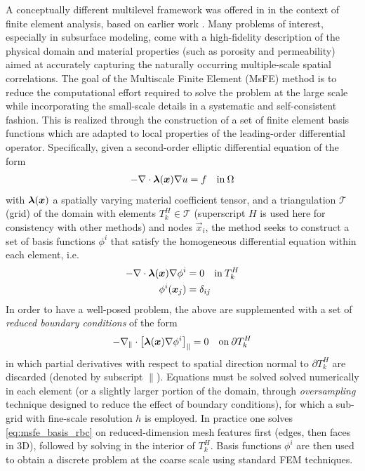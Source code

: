 A conceptually different multilevel framework was offered in \cite{Hou1997} in the context of finite element analysis, based on earlier work \cite{Babuska1983,Babuska1994}.   Many problems of interest, especially in subsurface modeling, come with a high-fidelity description of the physical domain and material properties (such as porosity and permeability) aimed at accurately capturing the naturally occurring multiple-scale spatial correlations.   The goal of the Multiscale Finite Element (MsFE) method is to reduce the computational effort required to solve the problem at the large scale while incorporating the small-scale details in a systematic and self-consistent fashion.   This is realized through the construction of a set of finite element basis functions which are adapted to local properties of the leading-order differential operator.   Specifically, given a second-order elliptic differential equation of the form
\begin{align}
    - \nabla \cdot \bm{\lambda}(\bm{x}) \nabla u = f \quad\text{in}\:\Omega
\end{align}
with $\bm{\lambda}(\bm{x})$ a spatially varying material coefficient tensor, and a triangulation $\mathcal{T}$ (grid) of the domain with elements $T_k^H \in \mathcal{T}$ (superscript $H$ is used here for consistency with other methods) and nodes $\vec{x}_i$, the method seeks to construct a set of basis functions $\phi^i$ that satisfy the homogeneous differential equation within each element, i.e.
\begin{align}
    - \nabla \cdot \bm{\lambda}(\bm{x}) \nabla \phi^i &= 0 \quad\text{in}\:T_k^H \label{eq:msfe_basis_pde}\\
    \phi^i(\bm{x}_j) &= \delta_{ij} \label{eq:msfe_basis_nodal_values}
\end{align}
In order to have a well-posed problem, the above are supplemented with a set of \textit{reduced boundary conditions} of the form
\begin{align}
    - \nabla_{\parallel} \cdot \left[\bm{\lambda}(\bm{x}) \nabla \phi^i\right]_{\parallel} = 0 \quad\text{on}\:\partial T_k^H \label{eq:msfe_basis_rbc}
\end{align}
in which partial derivatives with respect to spatial direction normal to $\partial T_k^H$ are discarded (denoted by subscript $\parallel$).   Equations  must be solved solved numerically in each element (or a slightly larger portion of the domain, through \textit{oversampling} technique designed to reduce the effect of boundary conditions), for which a sub-grid with fine-scale resolution $h$ is employed.   In practice one solves \cref{eq:msfe_basis_rbc} on reduced-dimension mesh features first (edges, then faces in 3D), followed by solving in the interior of $T_k^H$.   Basis functions $\phi^i$ are then used to obtain a discrete problem at the coarse scale using standard FEM techniques.   

